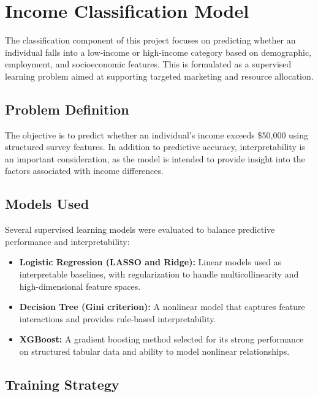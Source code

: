 
\section{Income Classification Model}

The classification component of this project focuses on predicting whether an individual falls into a low-income or high-income category based on demographic, employment, and socioeconomic features. This is formulated as a supervised learning problem aimed at supporting targeted marketing and resource allocation.

\subsection{Problem Definition}

The objective is to predict whether an individual's income exceeds \$50,000 using structured survey features. In addition to predictive accuracy, interpretability is an important consideration, as the model is intended to provide insight into the factors associated with income differences.

\subsection{Models Used}

Several supervised learning models were evaluated to balance predictive performance and interpretability:

\begin{itemize}
    \item \textbf{Logistic Regression (LASSO and Ridge):} Linear models used as interpretable baselines, with regularization to handle multicollinearity and high-dimensional feature spaces.
    \item \textbf{Decision Tree (Gini criterion):} A nonlinear model that captures feature interactions and provides rule-based interpretability.
    \item \textbf{XGBoost:} A gradient boosting method selected for its strong performance on structured tabular data and ability to model nonlinear relationships.
\end{itemize}

\subsection{Training Strategy}

